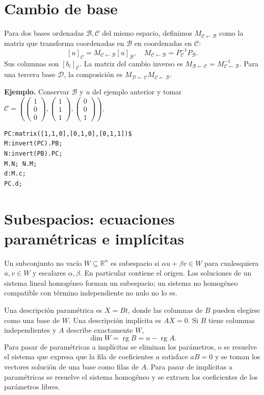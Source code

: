 \documentclass[12pt,a4paper]{article}
\begin{document}
\section{Cambio de base}
Para dos bases ordenadas $\mathcal B,\mathcal C$ del mismo espacio, definimos $M_{\mathcal C\leftarrow\mathcal B}$ como la matriz que transforma coordenadas en $\mathcal B$ en coordenadas en $\mathcal C$:
\[\boxed{[u]_{\mathcal C}=M_{\mathcal C\leftarrow\mathcal B}[u]_{\mathcal B},\quad M_{\mathcal C\leftarrow\mathcal B}=P_{\mathcal C}^{-1}P_{\mathcal B}.}\]
Sus columnas son $[b_i]_{\mathcal C}$. La matriz del cambio inverso es $M_{\mathcal B\leftarrow\mathcal C}=M_{\mathcal C\leftarrow\mathcal B}^{-1}$. Para una tercera base $\mathcal D$, la composición es $M_{\mathcal D\leftarrow\mathcal C}M_{\mathcal C\leftarrow\mathcal B}$.

\textbf{Ejemplo.} Conservar $\mathcal B$ y $u$ del ejemplo anterior y tomar $\mathcal C=(\begin{pmatrix}1\\0\\0\end{pmatrix},\begin{pmatrix}1\\1\\1\end{pmatrix},\begin{pmatrix}0\\0\\1\end{pmatrix})$.
\begin{lstlisting}
PC:matrix([1,1,0],[0,1,0],[0,1,1])$
M:invert(PC).PB;
N:invert(PB).PC;
M.N; N.M;
d:M.c;
PC.d;
\end{lstlisting}
\section{Subespacios: ecuaciones paramétricas e implícitas}
Un subconjunto no vacío $W\subseteq\mathbb R^n$ es subespacio si $\alpha u+\beta v\in W$ para cualesquiera $u,v\in W$ y escalares $\alpha,\beta$. En particular contiene el origen. Las soluciones de un sistema lineal homogéneo forman un subespacio; un sistema no homogéneo compatible con término independiente no nulo no lo es.

Una descripción paramétrica es $X=Bt$, donde las columnas de $B$ pueden elegirse como una base de $W$. Una descripción implícita es $AX=0$. Si $B$ tiene columnas independientes y $A$ describe exactamente $W$,
\[\boxed{\dim W=\operatorname{rg}B=n-\operatorname{rg}A.}\]
Para pasar de paramétricas a implícitas se eliminan los parámetros, o se resuelve el sistema que expresa que la fila de coeficientes $a$ satisface $aB=0$ y se toman los vectores solución de una base como filas de $A$. Para pasar de implícitas a paramétricas se resuelve el sistema homogéneo y se extraen los coeficientes de los parámetros libres.
\end{document}
